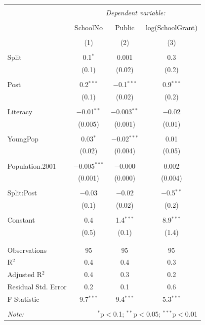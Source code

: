 \documentclass[12pt, a4paper]{article}
\begin{document}
\begin{table}[!htbp] \centering 
  \caption{} 
  \label{} 
\begin{tabular}{@{\extracolsep{5pt}}lccc} 
\\[-1.8ex]\hline 
\hline \\[-1.8ex] 
 & \multicolumn{3}{c}{\textit{Dependent variable:}} \\ 
\cline{2-4} 
\\[-1.8ex] & SchoolNo & Public & log(SchoolGrant) \\ 
\\[-1.8ex] & (1) & (2) & (3)\\ 
\hline \\[-1.8ex] 
 Split & 0.1$^{*}$ & 0.001 & 0.3 \\ 
  & (0.1) & (0.02) & (0.2) \\ 
  & & & \\ 
 Post & 0.2$^{***}$ & $-$0.1$^{***}$ & 0.9$^{***}$ \\ 
  & (0.1) & (0.02) & (0.2) \\ 
  & & & \\ 
 Literacy & $-$0.01$^{**}$ & $-$0.003$^{**}$ & $-$0.02 \\ 
  & (0.005) & (0.001) & (0.01) \\ 
  & & & \\ 
 YoungPop & 0.03$^{*}$ & $-$0.02$^{***}$ & 0.01 \\ 
  & (0.02) & (0.004) & (0.05) \\ 
  & & & \\ 
 Population.2001 & $-$0.005$^{***}$ & $-$0.000 & 0.002 \\ 
  & (0.001) & (0.000) & (0.004) \\ 
  & & & \\ 
 Split:Post & $-$0.03 & $-$0.02 & $-$0.5$^{**}$ \\ 
  & (0.1) & (0.02) & (0.2) \\ 
  & & & \\ 
 Constant & 0.4 & 1.4$^{***}$ & 8.9$^{***}$ \\ 
  & (0.5) & (0.1) & (1.4) \\ 
  & & & \\ 
\hline \\[-1.8ex] 
Observations & 95 & 95 & 95 \\ 
R$^{2}$ & 0.4 & 0.4 & 0.3 \\ 
Adjusted R$^{2}$ & 0.4 & 0.3 & 0.2 \\ 
Residual Std. Error & 0.2 & 0.1 & 0.6 \\ 
F Statistic & 9.7$^{***}$ & 9.4$^{***}$ & 5.3$^{***}$ \\ 
\hline 
\hline \\[-1.8ex] 
\textit{Note:}  & \multicolumn{3}{r}{$^{*}$p$<$0.1; $^{**}$p$<$0.05; $^{***}$p$<$0.01} \\ 
\end{tabular} 
\end{table} %
\end{document}
